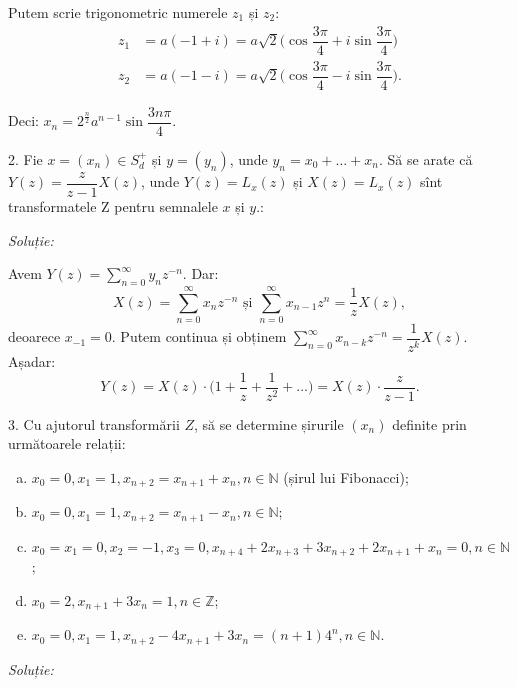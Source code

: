Putem scrie trigonometric numerele $z_1$ și $z_2$:
\begin{align*}
    z_1 &= a(-1 + i) = a \sqrt{2} \Big( \cos \dfrac{3\pi}{4} + i \sin \dfrac{3 \pi}{4} \Big) \\
    z_2 &= a(-1 - i) = a \sqrt{2} \Big( \cos \dfrac{3 \pi}{4} - i \sin \dfrac{3 \pi}{4} \Big).
\end{align*}

Deci: $x_n = 2^{\frac{n}{2}} a^{n-1} \sin \dfrac{3 n \pi}{4}$.



\vspace{0.3cm}

2. Fie $x = (x_n) \in S_d^+$ și $y = (y_n)$, unde $y_n = x_0 + \dots + x_n$. 
Să se arate că $Y(z) = \dfrac{z}{z-1} X(z)$, unde $ Y(z) = L_x(z) $ și $ X(z) = L_x(z) $
sînt transformatele Z pentru semnalele $ x $ și $ y $.:

\emph{Soluție:}

Avem $Y(z) = \displaystyle\sum_{n=0}^\infty y_n z^{-n}.$ Dar: 
\[
    X(z) = \sum_{n=0}^\infty x_n z^{-n} \text{ și } 
    \sum_{n=0}^\infty x_{n-1} z^n = \dfrac{1}{z} X(z),
\]
deoarece $x_{-1} = 0$. Putem continua și obținem 
$\displaystyle\sum_{n=0}^\infty x_{n-k} z^{-n} = \dfrac{1}{z^k} X(z)$. Așadar: 
\[
    Y(z) = X(z) \cdot \Big( 1 + \dfrac{1}{z} + \dfrac{1}{z^2} + \dots \Big) 
    = X(z) \cdot \dfrac{z}{z-1}.
\]


\vspace{0.3cm}

3. Cu ajutorul transformării $Z$, să se determine șirurile $(x_n)$ definite 
prin următoarele relații:
\begin{enumerate}[(a)]
    \item $x_0 = 0, x_1 = 1, x_{n+2} = x_{n+1} + x_n, n \in \mathbb{N}$ 
        (șirul lui Fibonacci);
    \item $x_0 = 0, x_1 = 1, x_{n+2} = x_{n+1} - x_n, n \in \mathbb{N}$;
    \item $x_0 = x_1 = 0, x_2 = -1, x_3 = 0, x_{n+4} + 
        2x_{n+3} + 3 x_{n+2} + 2 x_{n+1} + x_n = 0, n \in \mathbb{N}$;
    \item $x_0 = 2, x_{n+1} + 3x_n = 1, n \in \mathbb{Z}$;
    \item $x_0 = 0, x_1 = 1, x_{n+2} - 4 x_{n+1} + 3x_n 
        = (n+1)4^n, n \in \mathbb{N}$.
\end{enumerate}

\emph{Soluție:}

